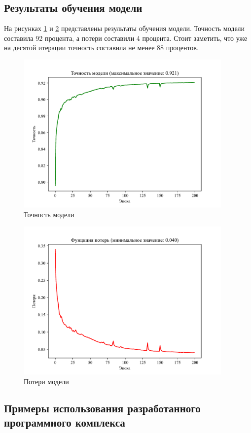 \subsection{Результаты обучения модели}

На рисунках \ref{fig:accuracy} и \ref{fig:loss} представлены результаты обучения модели. Точность модели составила 92 процента, а потери составили 4 процента. Стоит заметить, что уже на десятой итерации точность составила не менее 88 процентов.

\begin{figure}[H]
	\centering
	\includegraphics[width=400px]{img/accuracy.pdf}
	\caption{Точность модели}
	\label{fig:accuracy}
\end{figure}

\begin{figure}[H]
	\centering
	\includegraphics[width=400px]{img/loss.pdf}
	\caption{Потери модели}
	\label{fig:loss}
\end{figure}

\subsection{Примеры использования разработанного программного комплекса}

